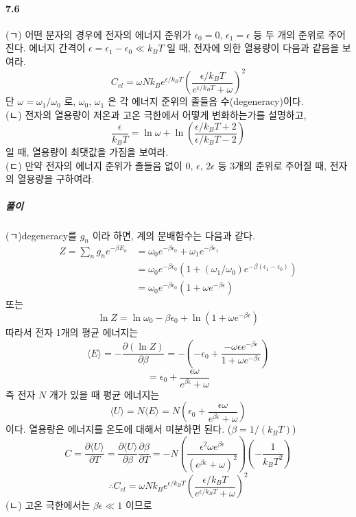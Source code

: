 \documentclass[a4paper,12pt]{report}
\begin{document}
	\paragraph{7.6 } (ㄱ) 어떤 분자의 경우에 전자의 에너지 준위가 $\epsilon_0=0,\,\epsilon_1=\epsilon$ 등 두 개의 준위로 주어진다. 에너지 간격이 $\epsilon=\epsilon_1-\epsilon_0\ll k_BT$ 일 때, 전자에 의한 열용량이 다음과 같음을 보여라.
	$$C_{el}=\omega Nk_Be^{\epsilon/k_BT}\left(\frac{\epsilon/k_BT}{e^{\epsilon/k_BT}+\omega} \right)^2 $$
	단 $\omega=\omega_1/\omega_0$ 로, $\omega_0,\,\omega_1$ 은 각 에너지 준위의 졸들음 수(degeneracy)이다.\\ 
	(ㄴ) 전자의 열용량이 저온과 고온 극한에서 어떻게 변화하는가를 설명하고,
	$$\frac{\epsilon}{k_BT}=\ln\omega+\ln\left(\frac{\epsilon/k_BT+2}{\epsilon/k_BT-2} \right)$$
	 일 때, 열용량이 최댓값을 가짐을 보여라.\\
	 (ㄷ) 만약 전자의 에너지 준위가 졸들음 없이 $0,\,\epsilon,\,2\epsilon$ 등 3개의 준위로 주어질 때, 전자의 열용량을 구하여라.
	\subparagraph{풀이} (ㄱ)degeneracy를 $g_n$ 이라 하면, 계의 분배함수는 다음과 같다.
	\begin{equation*}
		\begin{split}
		Z=\sum_{n}g_ne^{-\beta E_n}&=\omega_0e^{-\beta\epsilon_0}+\omega_1e^{-\beta\epsilon_1}\\
		&=\omega_0e^{-\beta\epsilon_0}(1+(\omega_1/\omega_0)e^{-\beta(\epsilon_1-\epsilon_0)})\\
		&=\omega_0e^{-\beta\epsilon_0}(1+\omega e^{-\beta\epsilon})
		\end{split}
	\end{equation*} 
	또는
	$$\ln Z=\ln \omega_0-\beta\epsilon_0+\ln(1+\omega e^{-\beta\epsilon})$$
	따라서 전자 1개의 평균 에너지는 
	$$\langle E\rangle=-\frac{\partial (\ln Z)}{\partial \beta}=-\left(-\epsilon_0+\frac{-\omega \epsilon e^{-\beta\epsilon}}{1+\omega e^{-\beta\epsilon}} \right) $$
	$$=\epsilon_0+\frac{\epsilon\omega}{e^{\beta\epsilon}+\omega}$$
	즉 전자 $N$ 개가 있을 때 평균 에너지는 
	$$\langle U\rangle =N\langle E\rangle=N\left(\epsilon_0+\frac{\epsilon\omega}{e^{\beta\epsilon}+\omega} \right) $$
	이다. 열용량은 에너지를 온도에 대해서 미분하면 된다. ($\beta=1/(k_BT)$)
	$$C=\frac{\partial \langle U\rangle}{\partial T}=\frac{\partial \langle U\rangle}{\partial \beta}\frac{\partial\beta}{\partial T}=-N\left(\frac{\epsilon^2\omega e^{\beta\epsilon}}{(e^{\beta\epsilon}+\omega)^2} \right)\left(-\frac{1}{k_BT^2} \right)  $$
	$$\therefore C_{el}=\omega Nk_Be^{\epsilon/k_BT}\left(\frac{\epsilon/k_BT}{e^{\epsilon/k_BT}+\omega} \right)^2$$
	(ㄴ) 고온 극한에서는 $\beta\epsilon\ll1$ 이므로 
\end{document}
